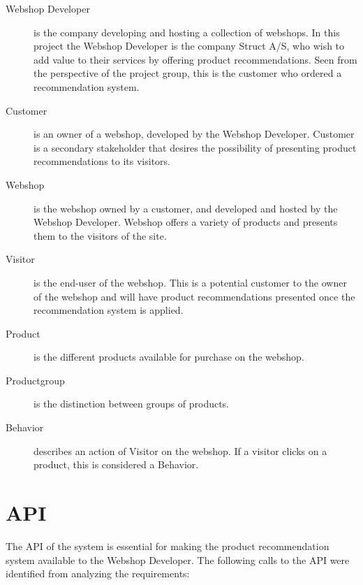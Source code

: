 \begin{description}
	\item[Webshop Developer] is the company developing and hosting a collection of webshops. In this project the Webshop Developer is the company Struct A/S, who wish to add value to their services by offering product recommendations. Seen from the perspective of the project group, this is the customer who ordered a recommendation system.
	\item[Customer] is an owner of a webshop, developed by the Webshop Developer. Customer is a secondary stakeholder that desires the possibility of presenting product recommendations to its visitors.
	\item[Webshop] is the webshop owned by a customer, and developed and hosted by the Webshop Developer. Webshop offers a variety of products and presents them to the visitors of the site.
	\item[Visitor] is the end-user of the webshop. This is a potential customer to the owner of the webshop and will have product recommendations presented once the recommendation system is applied.
	\item[Product] is the different products available for purchase on the webshop. 
	\item[Productgroup] is the distinction between groups of products.
	\item[Behavior] describes an action of Visitor on the webshop. If a visitor clicks on a product, this is considered a Behavior. 
\end{description}

\section{API}
The API of the system is essential for making the product recommendation system available to the Webshop Developer. The following calls to the API were identified from analyzing the requirements:

